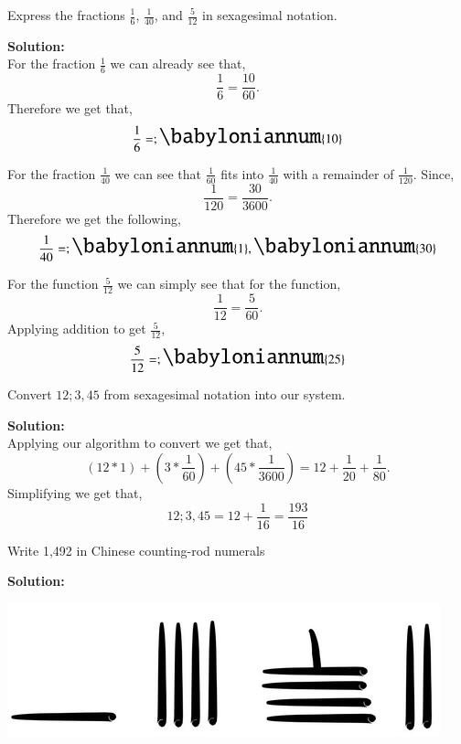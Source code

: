 \documentclass[12pt]{article}
\makeatletter
\newcommand{\Bnum}[1]{{\LARGE \babyloniannum{#1}}}
\theoremstyle{homework}
\newenvironment{exercise}[1]
{\def\@currentlabel{#1}\exercisecore}
{\endexercisecore}
\newcommand{\localhead}[1]{\par\smallskip\noindent\textbf{#1}\nobreak\\}%
\newcommand\solution{\localhead{Solution:}}
\makeatother
\begin{document}
\begin{exercise}{3} Express the fractions $\frac{1}{6}$, $\frac{1}{40}$, and $\frac{5}{12}$ in sexagesimal notation. \\
\solution For the fraction $\frac{1}{6}$ we can already see that, 
\begin{equation*}
    \frac{1}{6} = \frac{10}{60}.
\end{equation*}
Therefore we get that,
\begin{equation*}
    \frac{1}{6} =  ;\Bnum{10}
\end{equation*}

For the fraction $\frac{1}{40}$ we can see that $\frac{1}{60}$ fits into $\frac{1}{40}$ with a remainder of
$\frac{1}{120}$. Since, 
\begin{equation*}
    \frac{1}{120} = \frac{30}{3600}.
\end{equation*}
Therefore we get the following,
\begin{equation*}
 \frac{1}{40} =;\Bnum{1},\Bnum{30}    
\end{equation*}

For the function $\frac{5}{12}$ we can simply see that for the function,
\begin{equation*}
    \frac{1}{12} = \frac{5}{60}.
\end{equation*}
Applying addition to get $\frac{5}{12}$,
\begin{equation*}
    \frac{5}{12} = ;\Bnum{25}
\end{equation*}

\end{exercise}


\begin{exercise}{4} Convert $12;3,45$ from sexagesimal notation into our system.
    \solution Applying our algorithm to convert we get that, 
    \begin{equation*}
        (12*1)+(3*\frac{1}{60})+(45*\frac{1}{3600}) = 12 + \frac{1}{20} + \frac{1}{80}.
    \end{equation*}
    Simplifying we get that, 
    \begin{equation*}
        12;3,45 = 12 + \frac{1}{16} = \frac{193}{16}
    \end{equation*}
\end{exercise}



\begin{exercise}{6} Write 1,492 in Chinese counting-rod numerals
    \solution 
    \begin{center}
        \includegraphics[width = .33\textwidth]{chin.png}        
    \end{center}
    
\end{exercise}
\end{document}
